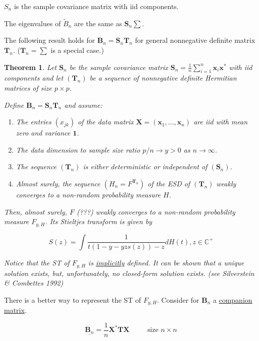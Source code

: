 \documentclass[twoside]{article}
\newcounter{lecnum}
\newtheorem{theorem}{Theorem}[lecnum]
\begin{document}
$S_n$ is the sample covariance matrix with iid components.

The eigenvalues of $\tilde{B}_n$ are the same as $\mathbf{S}_n\sum$.

The following result holds for $\mathbf{B}_n=\mathbf{S}_n\mathbf{T}_n$ for general nonnegative definite matrix $\mathbf{T}_n$. ($\mathbf{T}_n=\sum$ is a special case.)

\begin{theorem}
	Let $\mathbf{S}_n$ be the sample covariance matrix $\mathbf{S}_n=\frac1n\sum^n_{i=1}\mathbf{x}_i\mathbf{x}^*$ with iid components and let $(\mathbf{T}_n)$ be a sequence of nonnegative definite Hermitian matrices of size $p\times p$.
	
	Define $\mathbf{B}_n=\mathbf{S}_n\mathbf{T}_n$ and assume:
	
	\begin{enumerate}
		\item The entries $(x_{jk})$ of the data matrix $\mathbf{X}=(\mathbf{x}_1,\dots, \mathbf{x}_n)$ are iid with mean zero and variance $\mathbf{1}$.
		\item The data dimension to sample size ratio $p/n\to y>0$ as $n\to \infty$.
		\item The sequence $(\mathbf{T}_n)$ is either deterministic or independent of $(\mathbf{S}_n)$.
		\item Almost surely, the sequence $(H_n=F^{\mathbf{T}_n})$ of the ESD of $(\mathbf{T}_n)$ weakly converges to a non-random probability measure $H$.
	\end{enumerate}
	
	Then, almost surely, $F$ (???) weakly converges to a non-random probability measure $F_{y,H}$. Its Stieltjes transform is given by
	
	\begin{equation}S(z)=\int\frac{1}{t(1-y-yzs(z))-z}dH(t), z\in\mathbb{C}^+\end{equation}
	
	Notice that the ST of $F_{y,H}$ is \underline{implicitly} defined. It can be shown that a unique solution exists, but, unfortunately, no closed-form solution exists. (see Silverstein \& Combettes 1992)
\end{theorem}

There is a better way to represent the ST of $F_{y,H}$. Consider for $\mathbf{B}_n$ a \underline{companion matrix}.

$$\underline{\mathbf{B}_n}=\frac{1}{n}\mathbf{X}^*\mathbf{TX}\ \ \ \ \ \ \ \ \ \ \text{ size }n\times n$$
\end{document}
